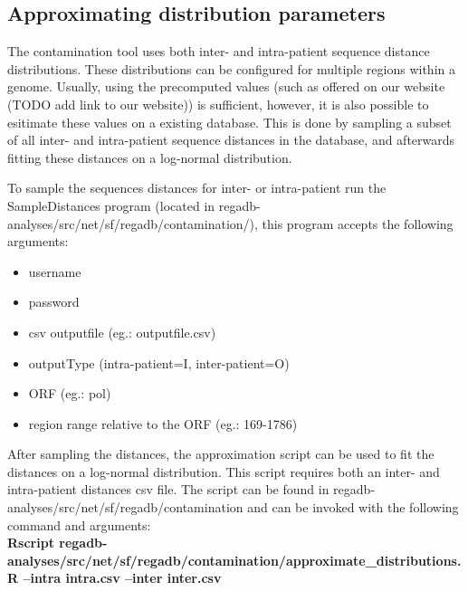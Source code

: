 \subsection{Approximating distribution parameters}
The contamination tool uses both inter- and intra-patient sequence distance distributions. These distributions can be configured for multiple regions within a genome. Usually, using the precomputed values (such as offered on our website (TODO add link to our website)) is sufficient, however, it is also possible to esitimate these values on a existing database.
This is done by sampling a subset of all inter- and intra-patient sequence distances in the database, and afterwards fitting these distances on a log-normal distribution.

To sample the sequences distances for inter- or intra-patient run the SampleDistances program (located in regadb-analyses/src/net/sf/regadb/contamination/), this program accepts the following arguments:
\begin{itemize}
\item username 
\item password 
\item csv outputfile (eg.: outputfile.csv) 
\item outputType (intra-patient=I, inter-patient=O) 
\item ORF (eg.: pol) 
\item region range relative to the ORF (eg.: 169-1786) 
\end{itemize}

After sampling the distances, the approximation script can be used to fit the distances on a log-normal distribution. This script requires both an inter- and intra-patient distances csv file. The script can be found in regadb-analyses/src/net/sf/regadb/contamination and can be invoked with the following command and arguments:
\\
\textbf{Rscript regadb-analyses/src/net/sf/regadb/contamination/approximate\_distributions.R --intra intra.csv --inter inter.csv}
